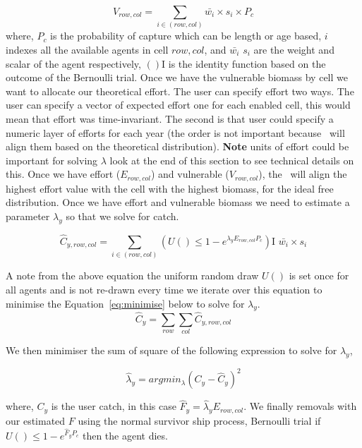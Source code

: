 \begin{equation}
	V_{row,col} = \sum_{i\in(row,col)} \bar{w_i} \times s_i \times P_c
\end{equation}
where, $P_c$ is the probability of capture which can be length or age based, $i$ indexes all the available agents in cell $row, col$, and $\bar{w_i}$  $s_i$ are the weight and scalar of the agent respectively, $()\text{I}$ is the identity function based on the outcome of the Bernoulli trial. Once we have the vulnerable biomass by cell we want to allocate our theoretical effort. The user can specify effort two ways. The user can specify a vector of expected effort one for each enabled cell, this would mean that effort was time-invariant. The second is that user could specify a numeric layer of efforts for each year (the order is not important because \IBM\ will align them based on the theoretical distribution). \textbf{Note} units of effort could be important for solving $\lambda$ look at the end of this section to see technical details on this. Once we have effort ($E_{row,col}$) and vulnerable ($V_{row,col}$), the \IBM\ will align the highest effort value with the cell with the highest biomass, for the ideal free distribution. Once we have effort and vulnerable biomass we need to estimate a parameter $\lambda_y$ so that we solve for catch.

\begin{equation}\label{eq:catch}
\hat{C}_{y,row,col} = \sum_{i\in(row,col)} (U() \leq 1- e^{\lambda_y E_{row,col} P_c})\text{I } \bar{w_i} \times s_i
\end{equation}

A note from the above equation the uniform random draw $U()$ is set once for all agents and is not re-drawn every time we iterate over this equation to minimise the Equation~\ref{eq:minimise} below to solve for $\lambda_y$.
\begin{equation}
\hat{C}_{y} = \sum_{row}\sum_{col} \hat{C}_{y,row,col} 
\end{equation}



We then minimiser the sum of square of the following expression to solve for $\lambda_y$,

\begin{equation}\label{eq:minimise}
	\hat{\lambda}_y = argmin_{\lambda}(C_y - \hat{C}_{y})^2
\end{equation}

where, $C_y$ is the user catch, in this case $\hat{F}_y =\hat{\lambda}_y E_{row,col}$. We finally removals with our estimated $F$ using the normal survivor ship process, Bernoulli trial if $U() \leq 1- e^{\hat{F}_y P_c}$ then the agent dies.\\

